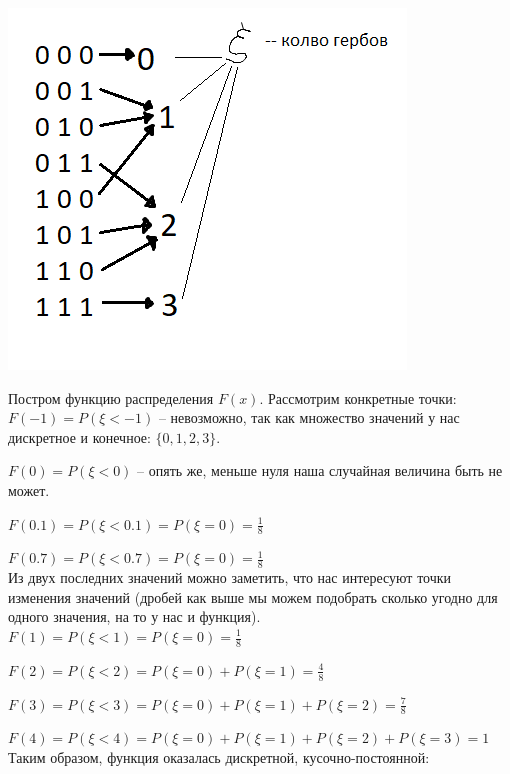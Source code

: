\documentclass{article}
\begin{document}
\begin{center}
    \includegraphics[scale=0.7]{8.png}
\end{center}

Постром функцию распределения $F(x)$. Рассмотрим конкретные точки:
\\

$F(-1) = P(\xi < -1)$ -- невозможно, так как множество значений у нас дискретное и конечное: $\{0, 1, 2, 3\} $.

$F(0) = P(\xi < 0)$ -- опять же, меньше нуля наша случайная величина быть не может.

$F(0.1) = P(\xi < 0.1) = P(\xi = 0) = \frac{1}{8}$

$F(0.7) = P(\xi < 0.7) = P(\xi = 0) = \frac{1}{8}$
\\

Из двух последних значений можно заметить, что нас интересуют точки изменения значений (дробей как выше мы можем подобрать сколько угодно для одного значения, на то у нас и функция).
\\

$F(1) = P(\xi < 1) = P(\xi = 0) = \frac{1}{8}$

$F(2) = P(\xi < 2) = P(\xi = 0) + P(\xi = 1) = \frac{4}{8}$

$F(3) = P(\xi < 3) = P(\xi = 0) + P(\xi = 1) + P(\xi = 2) = \frac{7}{8}$

$F(4) = P(\xi < 4) = P(\xi = 0) + P(\xi = 1) + P(\xi = 2) + P(\xi = 3) = 1$
\\

Таким образом, функция оказалась дискретной, кусочно-постоянной:
\end{document}
